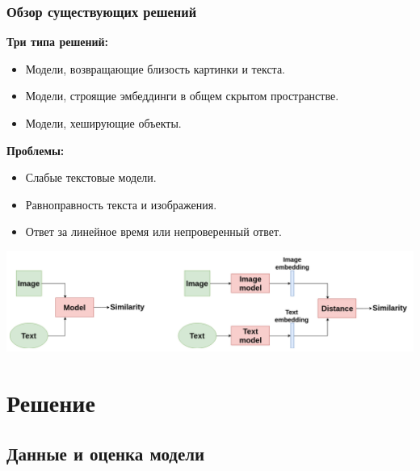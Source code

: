 \documentclass{beamer}
\begin{document}
\begin{frame}
	\frametitle{Обзор существующих решений}
	\textbf{Три типа решений:}
	\begin{itemize}
		\item
		Модели, возвращающие близость картинки и текста.
		
		\item
		Модели, строящие эмбеддинги в общем скрытом пространстве.
		
		\item
		Модели, хеширующие объекты.
	\end{itemize}
	
	\textbf{Проблемы:}
	\begin{itemize}
		\item
		Слабые текстовые модели.
		
		\item
		Равноправность текста и изображения.
		
		\item
		Ответ за линейное время или непроверенный ответ.
	\end{itemize}
	
	\centerline{\includegraphics[scale=0.27]{images/solution_types.png}}
\end{frame}

\section{Решение}
\subsection{Данные и оценка модели}
\end{document}

